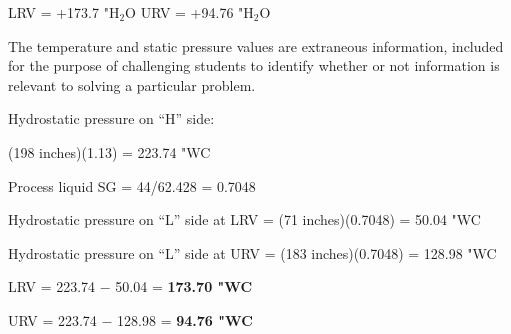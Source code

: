 





LRV = +173.7 "H$_{2}$O \hskip 50pt URV = +94.76 "H$_{2}$O

\vskip 10pt

The temperature and static pressure values are extraneous information, included for the purpose of challenging students to identify whether or not information is relevant to solving a particular problem.







Hydrostatic pressure on ``H'' side:

\vskip 10pt

(198 inches)(1.13) = 223.74 "WC

\vskip 20pt

Process liquid SG = 44/62.428 = 0.7048

\vskip 10pt

Hydrostatic pressure on ``L'' side at LRV = (71 inches)(0.7048) = 50.04 "WC

\vskip 10pt

Hydrostatic pressure on ``L'' side at URV = (183 inches)(0.7048) = 128.98 "WC

\vskip 20pt

LRV = 223.74 $-$ 50.04 = {\bf 173.70 "WC}

\vskip 10pt

URV = 223.74 $-$ 128.98 = {\bf 94.76 "WC}



